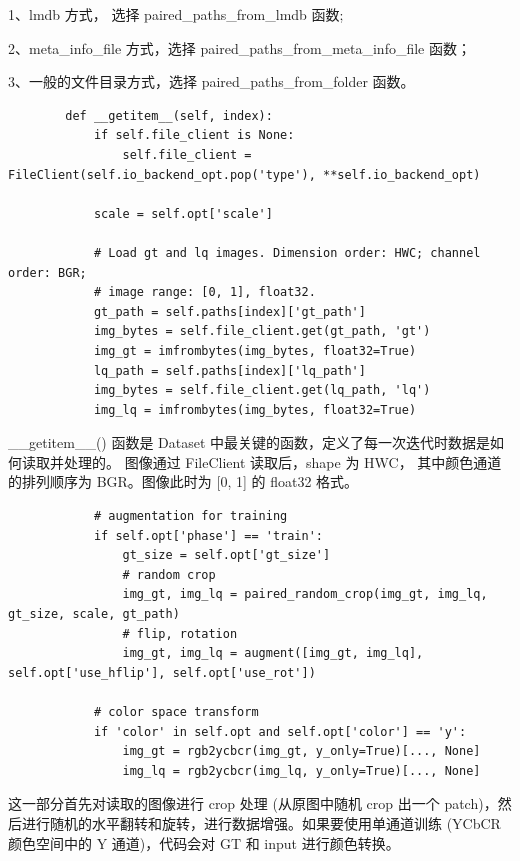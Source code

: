 \documentclass[../main.tex]{subfiles}
\begin{document}
	1、lmdb 方式， 选择 paired\_paths\_from\_lmdb 函数;
	
	2、meta\_info\_file 方式，选择 paired\_paths\_from\_meta\_info\_file 函数；
	
	3、一般的文件目录方式，选择 paired\_paths\_from\_folder 函数。
	
	\begin{verbatim}
        def __getitem__(self, index):
            if self.file_client is None:
                self.file_client = FileClient(self.io_backend_opt.pop('type'), **self.io_backend_opt)
    
            scale = self.opt['scale']
    
            # Load gt and lq images. Dimension order: HWC; channel order: BGR;
            # image range: [0, 1], float32.
            gt_path = self.paths[index]['gt_path']
            img_bytes = self.file_client.get(gt_path, 'gt')
            img_gt = imfrombytes(img_bytes, float32=True)
            lq_path = self.paths[index]['lq_path']
            img_bytes = self.file_client.get(lq_path, 'lq')
            img_lq = imfrombytes(img_bytes, float32=True)
	\end{verbatim}
	
    \_\_getitem\_\_() 函数是 Dataset 中最关键的函数，定义了每一次迭代时数据是如何读取并处理的。 图像通过 FileClient 读取后，shape 为 HWC， 其中颜色通道的排列顺序为 BGR。图像此时为 [0, 1] 的 float32 格式。
    
    \begin{verbatim}
            # augmentation for training
            if self.opt['phase'] == 'train':
                gt_size = self.opt['gt_size']
                # random crop
                img_gt, img_lq = paired_random_crop(img_gt, img_lq, gt_size, scale, gt_path)
                # flip, rotation
                img_gt, img_lq = augment([img_gt, img_lq], self.opt['use_hflip'], self.opt['use_rot'])
    
            # color space transform
            if 'color' in self.opt and self.opt['color'] == 'y':
                img_gt = rgb2ycbcr(img_gt, y_only=True)[..., None]
                img_lq = rgb2ycbcr(img_lq, y_only=True)[..., None]
	\end{verbatim}
	
	这一部分首先对读取的图像进行 crop 处理 (从原图中随机 crop 出一个 patch)，然后进行随机的水平翻转和旋转，进行数据增强。如果要使用单通道训练 (YCbCR 颜色空间中的 Y 通道)，代码会对 GT 和 input 进行颜色转换。
	
\end{document}
